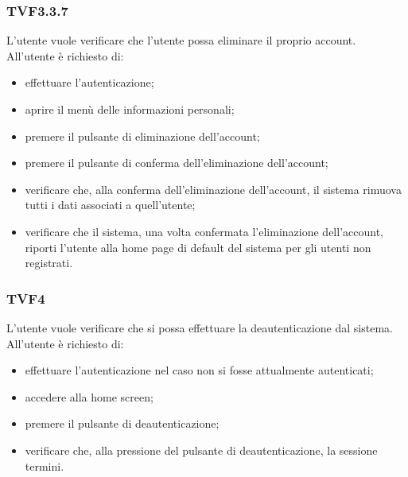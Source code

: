 		\subsubsection{TVF3.3.7}
			L'utente vuole verificare che l'utente possa eliminare il proprio account. All'utente è richiesto di:
			\begin{itemize}
				\item effettuare l'autenticazione;
				\item aprire il menù delle informazioni personali;
				\item premere il pulsante di eliminazione dell'account;
				\item premere il pulsante di conferma dell'eliminazione dell'account;
				\item verificare che, alla conferma dell'eliminazione dell'account, il sistema rimuova tutti i dati associati a quell'utente;
				\item verificare che il sistema, una volta confermata l'eliminazione dell'account, riporti l'utente alla home page di default del sistema per gli utenti non registrati.
			\end{itemize}
			
		\subsubsection{TVF4}
			L'utente vuole verificare che si possa effettuare la deautenticazione dal sistema. All'utente è richiesto di:
			\begin{itemize}
				\item effettuare l'autenticazione nel caso non si fosse attualmente autenticati;
				\item accedere alla home screen;
				\item premere il pulsante di deautenticazione;
				\item verificare che, alla pressione del pulsante di deautenticazione, la sessione termini.
			\end{itemize}
			
